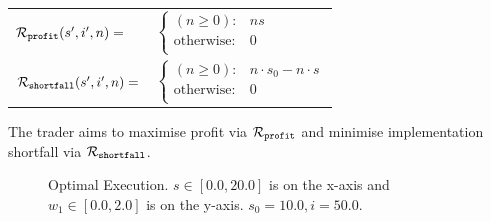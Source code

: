 \begin{itemize}
{        \abovedisplayskip=10pt
        \belowdisplayskip=0pt
        \renewcommand{\arraystretch}{1.5}
        \begin{tabular}{ll}    
            $ \mathcal{R}_{\mathtt{profit}}(s', i', n) = $ &  
            \qquad $ \begin{cases}
            (n \geq 0) : & ns \\
            \text{otherwise} : & 0 \\
            \end{cases} $ \\
            $ \mathcal{R}_{\mathtt{shortfall}}(s', i', n) = $ &  
            \qquad $ \begin{cases}
            (n \geq 0) : & n \cdot s_0 - n \cdot s \\
            \text{otherwise} : & 0 \\
            \end{cases} $ \\
        \end{tabular}
    }    
\end{itemize}

The trader aims to maximise profit via {\footnotesize $ \mathcal{R}_{\mathtt{profit}} $} and minimise implementation shortfall via {\footnotesize $ \mathcal{R}_{\mathtt{shortfall}} $}.

\begin{figure}[h!]
    \centering
    \caption{Optimal Execution. $ s \in \left[ 0.0, 20.0 \right]$ is on the x-axis and $ w_1 \in \left[ 0.0, 2.0 \right]$ is on the y-axis. $ s_0 = 10.0, i = 50.0$.}
    \label{fig:robot1d}
\end{figure}

